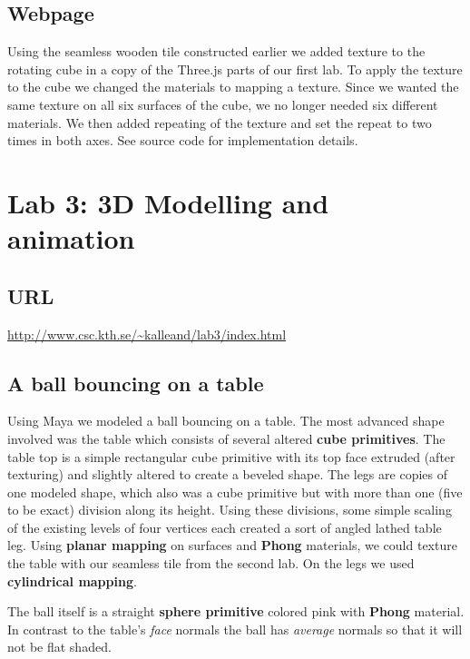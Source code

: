 \documentclass[a4paper]{article}
\begin{document}
\subsection{Webpage} %

Using the seamless wooden tile constructed earlier we added texture to the
rotating cube in a copy of the Three.js parts of our first lab. To apply the
texture to the cube we changed the materials to mapping a texture. Since we
wanted the same texture on all six surfaces of the cube, we no longer needed six
different materials. We then added repeating of the texture and set the repeat
to two times in both axes. See source code for implementation details.

\section{Lab 3: 3D Modelling and animation}

\subsection*{URL}

\url{http://www.csc.kth.se/~kalleand/lab3/index.html}

\subsection{A ball bouncing on a table} %

Using Maya we modeled a ball bouncing on a table. The most advanced shape
involved was the table  which consists of several altered \textbf{cube
primitives}. The table top is a simple rectangular cube primitive with its top
face extruded (after texturing) and slightly altered to create a beveled shape.
The legs are copies of one modeled shape, which also was a cube primitive but
with more than one (five to be exact) division along its height. Using these
divisions, some simple scaling of the existing levels of four vertices each
created a sort of angled lathed table leg. Using \textbf{planar mapping} on
surfaces and \textbf{Phong} materials, we could texture the table with our
seamless tile from the second lab. On the legs we used \textbf{cylindrical
mapping}.

The ball itself is a straight \textbf{sphere primitive} colored pink with
\textbf{Phong} material. In contrast to the table's \textit{face} normals the
ball has \textit{average} normals so that it will not be flat shaded.
\end{document}
